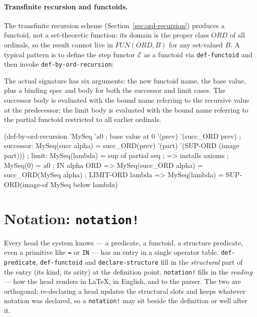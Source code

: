 \paragraph{Transfinite recursion and functoids.}
\begin{sloppypar}The transfinite recursion scheme
(Section~\ref{sec:ord-recursion}) produces a functoid, not a
set-theoretic function: its domain is the proper class $\mathit{ORD}$
of all ordinals, so the result cannot live in $\mathit{FUN}(\mathit{ORD}, B)$
for any set-valued $B$.  A typical pattern is to define the step
functor $\mathcal{E}$ as a functoid via \texttt{def-functoid} and
then invoke \texttt{def-by-ord-recursion}:\end{sloppypar}
The actual signature has six arguments: the new functoid name, the
base value, plus a binding spec and body for both the successor and
limit cases.  The successor body is evaluated with the bound name
referring to the recursive value at the predecessor; the limit body
is evaluated with the bound name referring to the partial functoid
restricted to all earlier ordinals.
\begin{VNBcode}
(def-by-ord-recursion 'MySeq
  'a0                                 ; base value at 0
  '(prev) '(succ_ORD prev)            ; successor: MySeq(succ alpha) = succ_ORD(prev)
  '(part) '(SUP-ORD (image part)))    ; limit:    MySeq(lambda) = sup of partial seq
; => installs axioms
;      MySeq(0) = a0
;      IN alpha ORD => MySeq(succ_ORD alpha) = succ_ORD(MySeq alpha)
;      LIMIT-ORD lambda => MySeq(lambda) = SUP-ORD(image-of MySeq below lambda)
\end{VNBcode}

\section{Notation: \texttt{notation!}}
\label{sec:notation}

Every head the system knows --- a predicate, a functoid, a structure predicate,
even a primitive like \texttt{=} or \texttt{IN} --- has an entry in a single
operator table.  \texttt{def-predicate}, \texttt{def-functoid} and
\texttt{declare-structure} fill in the \emph{structural} part of the entry (its
kind, its arity) at the definition point.  \texttt{notation!} fills in the
\emph{reading} --- how the head renders in \LaTeX, in English, and to the
parser.  The two are orthogonal: re-declaring a head updates the structural slots
and keeps whatever notation was declared, so a \texttt{notation!} may sit beside
the definition or well after it.

